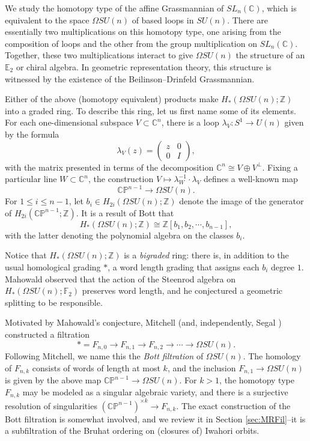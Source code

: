 We study the homotopy type of the affine Grassmannian of $SL_n(\mathbb{C})$, which is equivalent to the space $\Omega SU(n)$ of based loops in $SU(n)$.  There are essentially two multiplications on this homotopy type, one arising from the composition of loops and the other from the group multiplication on $SL_n(\mathbb{C})$.  Together, these two multiplications interact to give $\Omega SU(n)$ the structure of an $\mathbb{E}_2$ or chiral algebra.  In geometric representation theory, this structure is witnessed by the existence of the Beilinson--Drinfeld Grassmannian.

Either of the above (homotopy equivalent) products make $H_*(\Omega SU(n);\mathbb{Z})$ into a graded ring.  To describe this ring, let us first name some of its elements.  For each one-dimensional subspace $V \subset \mathbb{C}^n$, there is a loop $\lambda_V:S^1 \rightarrow U(n)$ given by the formula
$$\lambda_V(z)=\left( \begin{array}{cc} z & 0 \\ 0 & I \end{array} \right),$$
with the matrix presented in terms of the decomposition $\mathbb{C}^n \cong V \oplus V^{\perp}$.  Fixing a particular line $W \subset \mathbb{C}^n$, the construction $V \mapsto \lambda_W^{-1} \cdot \lambda_V$ defines a well-known map
$$\mathbb{CP}^{n-1} \rightarrow \Omega SU(n).$$
For $1 \le i \le n-1$, let $b_i \in H_{2i}(\Omega SU(n);\mathbb{Z})$ denote the image of the generator of $H_{2i}(\mathbb{CP}^{n-1};\mathbb{Z})$.  It is a result of Bott \cite{Bott} that
$$H_*(\Omega SU(n);\mathbb{Z}) \cong \mathbb{Z}[b_1,b_2,\cdots,b_{n-1}],$$
with the latter denoting the polynomial algebra on the classes $b_i$.

Notice that $H_*(\Omega SU(n);\mathbb{Z})$ is a \textit{bigraded} ring: there is, in addition to the usual homological grading $*$, a word length grading that assigns each $b_i$ degree $1$.  Mahowald observed that the action of the Steenrod algebra on $H_*(\Omega SU(n);\mathbb{F}_2)$ preserves word length, and he conjectured a geometric splitting to be responsible.

Motivated by Mahowald's conjecture, Mitchell \cite{MitchellSU(n)} (and, independently, Segal \cite{Segal}) constructed a filtration $$* =F_{n,0} \longrightarrow F_{n,1} \longrightarrow F_{n,2}\longrightarrow \cdots \longrightarrow \Omega SU(n).$$
Following Mitchell, we name this the \textit{Bott filtration} of $\Omega SU(n)$.  The homology of $F_{n,k}$ consists of words of length at most $k$, and the inclusion $F_{n,1} \rightarrow \Omega SU(n)$ is given by the above map $\mathbb{CP}^{n-1} \rightarrow \Omega SU(n)$.  For $k>1$, the homotopy type $F_{n,k}$ may be modeled as a singular algebraic variety, and there is a surjective resolution of singularities $(\mathbb{CP}^{n-1})^{\times k} \longrightarrow F_{n,k}$.  The exact construction of the Bott filtration is somewhat involved, and we review it in Section \ref{sec:MRFil}--it is a subfiltration of the Bruhat ordering on (closures of) Iwahori orbits.

